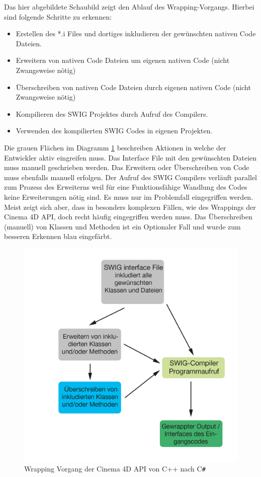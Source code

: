 \documentclass[pagesize, paper=a4, fontsize=12pt, titlepage=true, headings=small, headnosepline, abstractoff, liststotoc, nochapterprefix, plainheadsepline, twoside]{scrreprt}
\newcommand{\CS}{C\texttt{\#}}
\begin{document}
Das hier abgebildete Schaubild zeigt den Ablauf des Wrapping-Vorgangs. Hierbei sind folgende Schritte zu erkennen:
\begin{itemize}
\item Erstellen des *.i Files und dortiges inkludieren der gewünschten nativen Code Dateien.
\item Erweitern von nativen Code Dateien um eigenen nativen Code (nicht Zwangsweise nötig)
\item Überschreiben von nativen Code Dateien durch eigenen nativen Code (nicht Zwangsweise nötig)
\item Kompilieren des SWIG Projektes durch Aufruf des Compilers.
\item Verwenden des kompilierten SWIG Codes in eigenen Projekten.
\end{itemize}

Die grauen Flächen im Diagramm \ref{SWIG wrapping Vorgang} beschreiben Aktionen in welche der Entwickler aktiv eingreifen muss. Das Interface File mit den gewünschten Dateien muss manuell geschrieben werden. Das Erweitern oder Überschreiben von Code muss ebenfalls manuell erfolgen. Der Aufruf des SWIG Compilers verläuft parallel zum Prozess des Erweiterns weil für eine Funktionsfähige Wandlung des Codes keine Erweiterungen nötig sind. Es muss nur im Problemfall eingegriffen werden. Meist zeigt sich aber, dass in besonders komplexen Fällen, wie des Wrappings der Cinema 4D API, doch recht häufig eingegriffen werden muss. Das Überschreiben (manuell) von Klassen und Methoden ist ein Optionaler Fall und wurde zum besseren Erkennen blau eingefärbt.
\begin{figure}[ht]
	\centering
	\includegraphics[width=\linewidth]{Bilder/swig_wrapping_csharp.jpg}
	\caption{Wrapping Vorgang der Cinema 4D API von C++ nach \CS}
	\label{SWIG wrapping Vorgang}
\end{figure}
\end{document}
